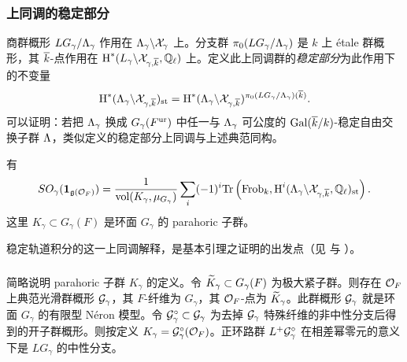 \subsubsection{上同调的稳定部分}\label{sss:st H} 商群概形 $LG_{\gamma}/\Lambda_{\gamma}$ 作用在 $\Lambda_{\gamma}\backslash\mathcal{X}_{\gamma}$ 上。分支群 $\pi_{0}(LG_{\gamma}/\Lambda_{\gamma})$ 是 $k$ 上 étale 群概形，其 $\overline{k}$-点作用在 $\textup{H}^{*}({L_{\gamma}\backslash\mathcal{X}_{\gamma,\overline{k}},\mathbb{Q}_{\ell}})$ 上。定义此上同调群的{\em 稳定部分}为此作用下的不变量
\begin{equation*}
\textup{H}^{*}({\Lambda_{\gamma}\backslash\mathcal{X}_{\gamma,\overline{k}}})_{\textup{st}}=\textup{H}^{*}({\Lambda_{\gamma}\backslash\mathcal{X}_{\gamma,\overline{k}}})^{\pi_{0}(LG_{\gamma}/\Lambda_{\gamma})(\overline{k})}.
\end{equation*}
可以证明：若把 $\Lambda_{\gamma}$ 换成 $G_{\gamma}(F^{\textup{ur}})$ 中任一与 $\Lambda_{\gamma}$ 可公度的 $\textup{Gal}(\overline{k}/k)$-稳定自由交换子群 $\Lambda$，类似定义的稳定部分上同调与上述典范同构。

\begin{theorem}\label{th:orb coho} 有
\begin{equation}\label{d}
SO_{\gamma}(\mathbf{1}_{\mathfrak{g}(\mathcal{O}_{F})})=\frac{1}{\textup{vol}(K_{\gamma},\mu_{G_{\gamma}})}\sum_{i}(-1)^{i}\textup{Tr}\left(\textup{Frob}_{k}, \textup{H}^{i}({\Lambda_{\gamma}\backslash\mathcal{X}_{\gamma,\overline{k}},\mathbb{Q}_{\ell}})_{\textup{st}}\right).
\end{equation}
这里 $K_{\gamma}\subset G_{\gamma}(F)$ 是环面 $G_{\gamma}$ 的 parahoric 子群。
\end{theorem}

稳定轨道积分的这一上同调解释，是基本引理之证明的出发点（见 \cite{GKM} 与 \cite{NgoFL}）。

\subsubsection{}\label{sss:K gamma} 简略说明 parahoric 子群 $K_{\gamma}$ 的定义。令 $\widetilde{K}_{\gamma}\subset G_{\gamma}(F)$ 为极大紧子群。则存在 $\mathcal{O}_{F}$ 上典范光滑群概形 $\mathcal{G}_{\gamma}$，其 $F$-纤维为 $G_{\gamma}$，其 $\mathcal{O}_{F}$-点为 $\widetilde{K}_{\gamma}$。此群概形 $\mathcal{G}_{\gamma}$ 就是环面 $G_{\gamma}$ 的有限型 Néron 模型。令 $\mathcal{G}^{\circ}_{\gamma}\subset\mathcal{G}_{\gamma}$ 为去掉 $\mathcal{G}_{\gamma}$ 特殊纤维的非中性分支后得到的开子群概形。则按定义 $K_{\gamma}=\mathcal{G}^{\circ}_{\gamma}(\mathcal{O}_{F})$。正环路群 $L^{+}\mathcal{G}^{\circ}_{\gamma}$ 在相差幂零元的意义下是 $LG_{\gamma}$ 的中性分支。


